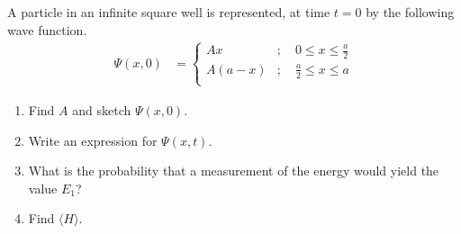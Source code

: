 \documentclass[fleqn, a4paper, 11pt, oneside]{amsart}
\theoremstyle{definition}
\theoremstyle{theorem}
\begin{document}
\begin{question}
	A particle in an infinite square well is represented, at time $t = 0$ by the following wave function.
	\begin{align*}
		\Psi(x,0) &=
			\begin{cases}
				A x       & ;\quad 0 \le x \le \frac{a}{2} \\
				A (a - x) & ;\quad \frac{a}{2} \le x \le a \\
			\end{cases}
	\end{align*}
	\begin{enumerate}
		\item Find $A$ and sketch $\Psi(x,0)$.
		\item Write an expression for $\Psi(x,t)$.
		\item What is the probability that a measurement of the energy would yield the value $E_1$?
		\item Find $\langle H \rangle$.
	\end{enumerate}
\end{question}
\end{document}
